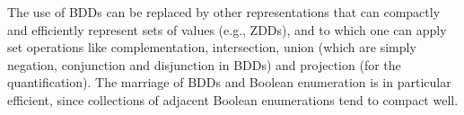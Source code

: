 The use of BDDs can be replaced by other representations that
can compactly and efficiently represent sets of values (e.g., ZDDs), and to which one can apply set operations like complementation, intersection, union (which are simply negation, conjunction and disjunction
in BDDs) and projection (for the quantification).
The marriage of BDDs and Boolean enumeration is in particular
efficient, since collections of adjacent Boolean enumerations tend to compact well.



%
 


